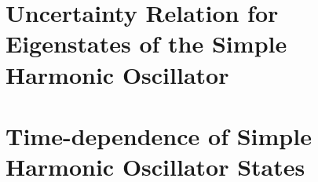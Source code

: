 \documentclass[
a4paper,
10pt,
twoside,
]{article}
\begin{document}
\subsection{} %
\subsection{} %

\section{Uncertainty Relation for Eigenstates of the Simple Harmonic Oscillator}

\section{Time-dependence of Simple Harmonic Oscillator States}
\subsection{} %
\subsection{} %
\subsection{} %

\printbib


\stopmcols
\end{document}
